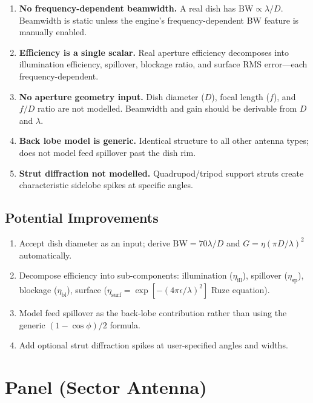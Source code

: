 \documentclass[11pt,a4paper]{article}
\begin{document}
\begin{enumerate}[nosep]
    \item \textbf{No frequency-dependent beamwidth.} A real dish has $\text{BW} \propto \lambda / D$. Beamwidth is static unless the engine's frequency-dependent BW feature is manually enabled.
    \item \textbf{Efficiency is a single scalar.} Real aperture efficiency decomposes into illumination efficiency, spillover, blockage ratio, and surface RMS error---each frequency-dependent.
    \item \textbf{No aperture geometry input.} Dish diameter ($D$), focal length ($f$), and $f/D$ ratio are not modelled. Beamwidth and gain should be derivable from $D$ and $\lambda$.
    \item \textbf{Back lobe model is generic.} Identical structure to all other antenna types; does not model feed spillover past the dish rim.
    \item \textbf{Strut diffraction not modelled.} Quadrupod/tripod support struts create characteristic sidelobe spikes at specific angles.
\end{enumerate}

\subsection{Potential Improvements}

\begin{enumerate}[nosep]
    \item Accept dish diameter as an input; derive $\text{BW} = 70\lambda / D$ and $G = \eta (\pi D / \lambda)^2$ automatically.
    \item Decompose efficiency into sub-components: illumination ($\eta_\text{ill}$), spillover ($\eta_\text{sp}$), blockage ($\eta_\text{bl}$), surface ($\eta_\text{surf} = \exp[-(4\pi\epsilon/\lambda)^2]$ Ruze equation).
    \item Model feed spillover as the back-lobe contribution rather than using the generic $(1-\cos\phi)/2$ formula.
    \item Add optional strut diffraction spikes at user-specified angles and widths.
\end{enumerate}


\newpage
\section{Panel (Sector Antenna)}
\end{document}
